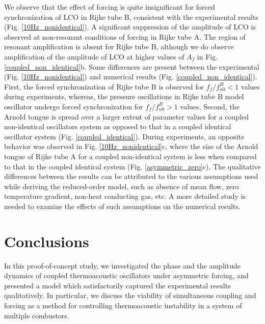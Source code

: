 \documentclass[%
preprint,
 amsmath,amssymb,
 aps,
 pra,
]{revtex4-2}
\begin{document}
We observe that the effect of forcing is quite insignificant for forced synchronization of LCO in Rijke tube B, consistent with the experimental results (Fig. \ref{10Hz_nonidentical}). A significant suppression of the amplitude of LCO is observed at non-resonant conditions of forcing in Rijke tube A. The region of resonant amplification is absent for Rijke tube B, although we do observe amplification of the amplitude of LCO at higher values of $A_f$ in Fig. \ref{coupled_non_identical}b. Some differences are present between the experimental (Fig. \ref{10Hz_nonidentical}) and numerical results (Fig. \ref{coupled_non_identical}). First, the forced synchronization of Rijke tube B is observed for $f_f/f_{n0}^B < 1$ values during experiments, whereas, the pressure oscillations in Rijke tube B model oscillator undergo forced synchronization for $f_f/f_{n0}^B > 1$ values. Second, the Arnold tongue is spread over a larger extent of parameter values for a coupled non-identical oscillators system as opposed to that in a coupled identical oscillator system (Fig. \ref{coupled_identical}). During experiments, an opposite behavior was observed in Fig. \ref{10Hz_nonidentical}c, where the size of the Arnold tongue of Rijke tube A for a coupled non-identical system is less when compared to that in the coupled identical system (Fig. \ref{asymmetric_zero}c). The qualitative differences between the results can be attributed to the various assumptions used while deriving the reduced-order model, such as absence of mean flow, zero temperature gradient, non-heat conducting gas, etc. A more detailed study is needed to examine the effects of such assumptions on the numerical results. 

\section{Conclusions}
\label{Conclusions}

In this proof-of-concept study, we investigated the phase and the amplitude dynamics of coupled thermoacoustic oscillators under asymmetric forcing, {\color{blue}and presented a model which satisfactorily captured the experimental results qualitatively.} In particular, we discuss the viability of simultaneous coupling and forcing as a method for controlling thermoacoustic instability in a system of multiple combustors.
\end{document}
